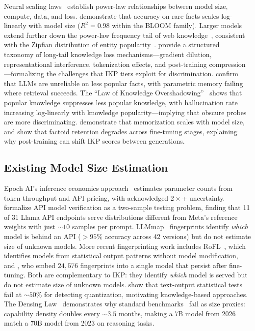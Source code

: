 \documentclass[11pt]{article}
\begin{document}
Neural scaling laws~\citep{kaplan2020scaling, hoffmann2022training} establish power-law relationships between model size, compute, data, and loss. \citet{kandpal2023} demonstrate that accuracy on rare facts scales log-linearly with model size ($R^2 = 0.98$ within the BLOOM family). Larger models extend further down the power-law frequency tail of web knowledge~\citep{tirumala2022}, consistent with the Zipfian distribution of entity popularity~\citep{zipf1949human, piantadosi2014zipf}. \citet{badhe2026longtail} provide a structured taxonomy of long-tail knowledge loss mechanisms---gradient dilution, representational interference, tokenization effects, and post-training compression---formalizing the challenges that IKP tiers exploit for discrimination. \citet{mallen2023trust} confirm that LLMs are unreliable on less popular facts, with parametric memory failing where retrieval succeeds. The ``Law of Knowledge Overshadowing''~\citep{overshadow2025} shows that popular knowledge suppresses less popular knowledge, with hallucination rate increasing log-linearly with knowledge popularity---implying that obscure probes are more discriminating. \citet{carlini2021extracting, carlini2023quantifying} demonstrate that memorization scales with model size, and \citet{chen2025factoids} show that factoid retention degrades across fine-tuning stages, explaining why post-training can shift IKP scores between generations.

\subsection{Existing Model Size Estimation}

Epoch AI's inference economics approach~\citep{epochai2024} estimates parameter counts from token throughput and API pricing, with acknowledged $2\times$+ uncertainty. \citet{gao2025modelequality} formalize API model verification as a two-sample testing problem, finding that 11 of 31 Llama API endpoints serve distributions different from Meta's reference weights with just ${\sim}10$ samples per prompt. LLMmap~\citep{llmmap2025} fingerprints identify \emph{which} model is behind an API ($>95\%$ accuracy across 42 versions) but do not estimate size of unknown models. More recent fingerprinting work includes RoFL~\citep{tsai2025rofl}, which identifies models from statistical output patterns without model modification, and \citet{nasery2025fingerprinting}, who embed $24{,}576$ fingerprints into a single model that persist after fine-tuning. Both are complementary to IKP: they identify \emph{which} model is served but do not estimate size of unknown models. \citet{cai2025substitution} show that text-output statistical tests fail at ${\sim}50\%$ for detecting quantization, motivating knowledge-based approaches. The Densing Law~\citep{densing2025} demonstrates why standard benchmarks~\citep{hendrycks2021measuring, joshi2017triviaqa, kwiatkowski2019natural, liang2023holistic} fail as size proxies: capability density doubles every ${\sim}3.5$ months, making a 7B model from 2026 match a 70B model from 2023 on reasoning tasks.
\end{document}
